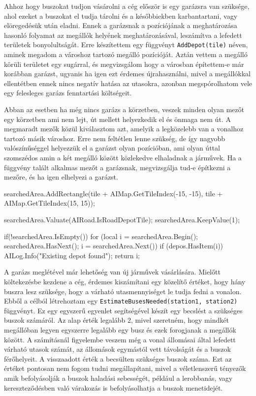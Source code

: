 Ahhoz hogy buszokat tudjon vásárolni a cég először is egy garázsra van szüksége, ahol ezeket a buszokat el tudja tárolni és a későbbiekben karbantartani, vagy elöregedésük után eladni. Ennek a garázsnak a pozíciójának a meghatározása hasonló folyamat az megállók helyének meghatározásával, leszámítva a lefedett területek bonyolultságát. Erre készítettem egy függvényt \texttt{AddDepot(tile)} néven, aminek megadom a városhoz tartozó megálló pozícióját. Aztán vettem a megálló körüli területet egy sugárral, és megvizsgálom hogy a városban építettem-e már korábban garázst, ugyanis ha igen ezt érdemes újrahasználni, mivel a megállókkal ellentétben ennek nincs negatív hatása az utasokra, azonban megspórolhatom vele egy felesleges garázs fenntartási költségeit.

Abban az esetben ha még nincs garázs a körzetben, veszek minden olyan mezőt egy körzetben ami nem lejt, út mellett helyezkedik el és önmaga nem út. A megmaradt mezők közül kiválasztom azt, amelyik a legközelebb van a vonalhoz tartozó másik városhoz. Erre nem feltétlen lenne szükség, de így nagyobb valószínűséggel helyezzük el a garázst olyan pozícióban, ami olyan úttal szomszédos amin a két megálló között közlekedve elhaladnak a járművek. Ha a függvény talált alkalmas mezőt a garázsnak, megvizsgálja tud-e építkezni a mezőre, és ha igen elhelyezi a garázst.

\begin{cpp}
searchedArea.AddRectangle(tile + AIMap.GetTileIndex(-15, -15),
 tile + AIMap.GetTileIndex(15, 15));

searchedArea.Valuate(AIRoad.IsRoadDepotTile);
searchedArea.KeepValue(1);

if(!searchedArea.IsEmpty()) {
  for (local i = searchedArea.Begin(); 
   searchedArea.HasNext(); i = searchedArea.Next()) {
    if (depos.HasItem(i)) {
      AILog.Info("Existing depot found");
      return i;
    }
  }
}
\end{cpp}

A garázs meglétével már lehetőség van új járművek vásárlására. Mielőtt költekezésbe kezdene a cég, érdemes kiszámítani egy közelítő értéket, hogy hány buszra lesz szüksége, hogy a várható utasmennyiséget le tudja fedni a vonalon. Ebből a célból létrehoztam egy \texttt{EstimateBusesNeeded(station1, station2)} függvényt. Ez egy egyszerű egyenlet segítségével készít egy becslést a szükséges buszok számáról. Az alap érték legalább 2, mivel szeretném, hogy mindkét megállóban legyen egyszerre legalább egy busz és ezek forogjanak a megállók között. A számításnál figyelembe veszem még a vonal állomásai által lefedett várható utasok számát, az állomások egymástól vett távolságát és a buszok férőhelyeit. A visszaadott érték a becsülten szükséges buszok száma. Ezt az értéket pontosan nem fogom tudni megállapítani, mivel a véletlenszerű tényezők amik befolyásolják a buszok haladási sebességét, például a lerobbanás, vagy kereszteződésben való várakozás is befolyásolhatja a buszok menetidejét.

